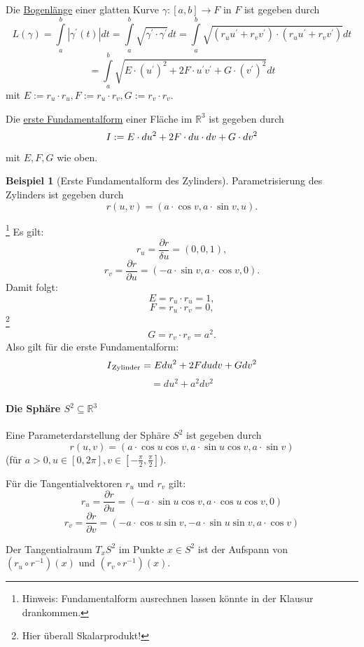 \documentclass[a4paper,11pt,notitlepage]{report}
\theoremstyle{definition}
\newtheorem{example}{Beispiel}[chapter]
\newcommand{\R}{{\ensuremath{\mathbb{R}}}}
\newcommand{\RM}[1]{\MakeUppercase{\romannumeral #1{}}}
\begin{document}
\begin{definition}
	Die \underline{Bogenlänge} einer glatten Kurve $\gamma \colon [a,b] \rightarrow F$ in $F$ ist gegeben durch
	$$L(\gamma) = \int\limits_a^b{|\gamma^\prime(t)|} dt = \int\limits_a^b{\sqrt{\gamma^\prime \cdot \gamma^\prime} dt} = \int\limits_a^b{\sqrt{(r_u u^\prime + r_v v^\prime) \cdot (r_u u^\prime + r_v v^\prime)} dt}$$
	$$= \int\limits_a^b{\sqrt{E \cdot (u^\prime)^2 + 2 F \cdot u^\prime v^\prime + G \cdot (v^\prime)^2} dt}$$ mit $E:= r_u \cdot r_u, F:= r_u \cdot r_v, G := r_v \cdot r_v$.
\end{definition}

\begin{definition}
	Die \underline{erste Fundamentalform} einer Fläche im $\R^3$ ist gegeben durch
	$$\RM{1} := E \cdot d u^2 + 2 F \cdot du \cdot dv + G \cdot dv^2$$ mit $E,F,G$ wie oben.
\end{definition}

\begin{example}[Erste Fundamentalform des Zylinders]
	Parametrisierung des Zylinders ist gegeben durch
	$$r(u,v) = (a \cdot \cos v, a \cdot \sin v, u).$$
\end{example}
\footnote{Hinweis: Fundamentalform ausrechnen lassen könnte in der Klausur drankommen.}
Es gilt:
$$r_u = \frac{\partial r}{\delta u} = (0,0,1),$$
$$r_v = \frac{\partial r}{\partial u} = (-a \cdot \sin v, a \cdot \cos v, 0).$$
Damit folgt:
$$E = r_u \cdot r_u = 1,$$
$$F = r_u \cdot r_v = 0,$$ \footnote{Hier überall Skalarprodukt!}
$$G = r_v \cdot r_v = a^2.$$
Also gilt für die erste Fundamentalform:
$$\RM{1}_\text{Zylinder} = E du^2 + 2 F dudv + G dv^2$$
$$= du^2 + a^2 dv^2$$

\paragraph{Die Sphäre $S^2 \subseteq \R^3$}
Eine Parameterdarstellung der Sphäre $S^2$ ist gegeben durch
$$r(u,v) = (a \cdot \cos u \cos v, a \cdot \sin u \cos v, a \cdot \sin v)$$
(für $a>0, u \in [0,2 \pi], v \in \left[ - \frac{\pi}{2}, \frac{\pi}{2} \right]$).

Für die Tangentialvektoren $r_u$ und $r_v$ gilt:
$$r_u = \frac{\partial r}{\partial u} = (- a \cdot \sin u \cos v, a \cdot \cos u \cos v, 0)$$
$$r_v = \frac{\partial r}{\partial v} = (- a \cdot \cos u \sin v, -a \cdot \sin u \sin v, a \cdot \cos v)$$

Der Tangentialraum $T_x S^2$ im Punkte $x \in S^2$ ist der Aufspann von $(r_u\circ r^{-1})(x)$ und $(r_v\circ r^{-1})(x)$.
\end{document}
